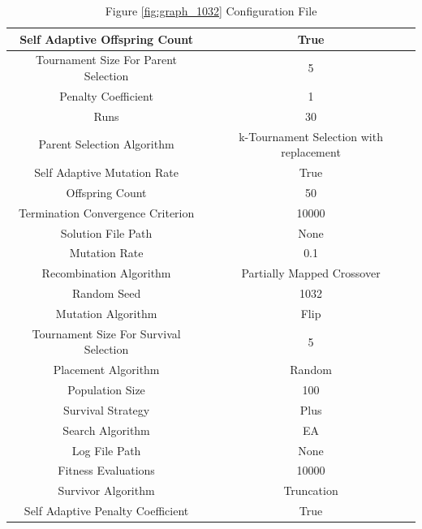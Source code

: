 \documentclass{standalone}
\begin{document}
\begin{table}[!htb]
	\centering
	\caption{Figure \ref{fig:graph_1032} Configuration File}
	\label{tab:graph_1032}
	\begin{tabular}{| c | c |}
		\hline
		Self Adaptive Offspring Count		& True		 \\
		\hline
		Tournament Size For Parent Selection		& 5		 \\
		\hline
		Penalty Coefficient		& 1		 \\
		\hline
		Runs		& 30		 \\
		\hline
		Parent Selection Algorithm		& k-Tournament Selection with replacement		 \\
		\hline
		Self Adaptive Mutation Rate		& True		 \\
		\hline
		Offspring Count		& 50		 \\
		\hline
		Termination Convergence Criterion		& 10000		 \\
		\hline
		Solution File Path		& None		 \\
		\hline
		Mutation Rate		& 0.1		 \\
		\hline
		Recombination Algorithm		& Partially Mapped Crossover		 \\
		\hline
		Random Seed		& 1032		 \\
		\hline
		Mutation Algorithm		& Flip		 \\
		\hline
		Tournament Size For Survival Selection		& 5		 \\
		\hline
		Placement Algorithm		& Random		 \\
		\hline
		Population Size		& 100		 \\
		\hline
		Survival Strategy		& Plus		 \\
		\hline
		Search Algorithm		& EA		 \\
		\hline
		Log File Path		& None		 \\
		\hline
		Fitness Evaluations		& 10000		 \\
		\hline
		Survivor Algorithm		& Truncation		 \\
		\hline
		Self Adaptive Penalty Coefficient		& True		 \\
		\hline
	\end{tabular}
\end{table}
\end{document}
